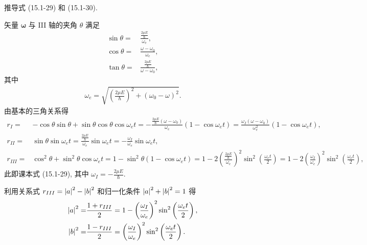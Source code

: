 \documentclass[twoside]{note}
\begin{document}
\begin{exe}
    推导式 (15.1-29) 和 (15.1-30).
\end{exe}
\begin{pf}
    矢量 $\bm{\omega}$ 与 III 轴的夹角 $\theta$ 满足
    \begin{align}
        \sin\theta=&\frac{\frac{2\mu E}{\hbar}}{\omega_e},\\
        \cos\theta=&\frac{\omega-\omega_0}{\omega_e},\\
        \tan\theta=&\frac{\frac{2\mu E}{\hbar}}{\omega-\omega_0},
    \end{align}
    其中
    \begin{align}
        \omega_e=\sqrt{\left(\frac{2\mu E}{\hbar}\right)^2+(\omega_0-\omega)^2}.
    \end{align}
    由基本的三角关系得
    \begin{align}
        r_I=&-\cos\theta\sin\theta+\sin\theta\cos\theta\cos\omega_et=-\frac{\frac{2\mu E}{\hbar}(\omega-\omega_0)}{\omega_e}(1-\cos\omega_et)=\frac{\omega_I(\omega-\omega_0)}{\omega_e^2}(1-\cos\omega_et),\\
        r_{II}=&\sin\theta\sin\omega_et=\frac{\frac{2\mu E}{\hbar}}{\omega_e}\sin\omega_et=-\frac{\omega_I}{\omega_e}\sin\omega_et,\\
        r_{III}=&\cos^2\theta+\sin^2\theta\cos\omega_et=1-\sin^2\theta(1-\cos\omega_et)=1-2\left(\frac{\frac{2\mu E}{\hbar}}{\omega_e}\right)^2\sin^2\left(\frac{\omega_et}{2}\right)=1-2\left(\frac{\omega_I}{\omega_e}\right)^2\sin^2\left(\frac{\omega_et}{2}\right),
    \end{align}
    此即课本式 (15.1-29), 其中 $\omega_I=-\frac{2\mu E}{\hbar}$.

    利用关系式 $r_{III}=\left\lvert a\right\rvert^2-\left\lvert b\right\rvert^2$ 和归一化条件 $\left\lvert a\right\rvert^2+\left\lvert b\right\rvert^2=1$ 得
    \begin{align}
        \left\lvert a\right\rvert^2=&\frac{1+r_{III}}{2}=1-\left(\frac{\omega_I}{\omega_e}\right)^2\sin^2\left(\frac{\omega_et}{2}\right),\\
        \left\lvert b\right\rvert^2=&\frac{1-r_{III}}{2}=\left(\frac{\omega_I}{\omega_e}\right)^2\sin^2\left(\frac{\omega_et}{2}\right).
    \end{align}
\end{pf}
\end{document}
